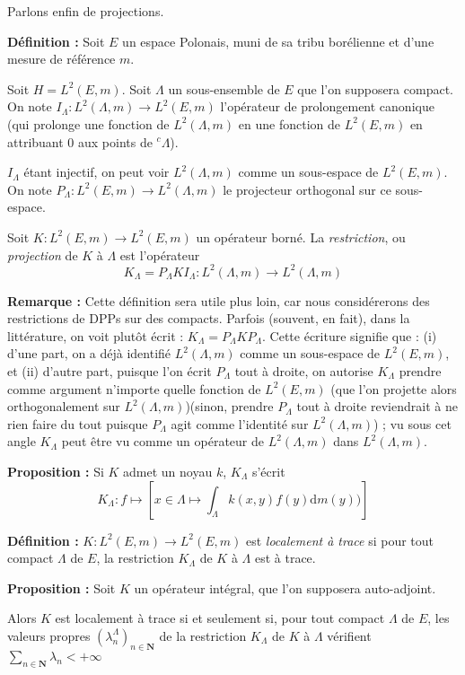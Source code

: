 \documentclass[12pt]{article}
\let\oldsum\sum
\renewcommand{\sum}{\oldsum\limits}
\begin{document}
Parlons enfin de projections.

\textbf{Définition :} Soit $E$ un espace Polonais, muni de sa tribu borélienne et d'une mesure de référence $m$. 

Soit $ H = L^2(E,m) $. Soit $\Lambda $ un sous-ensemble de $E$ que l'on supposera compact. On note $ I_\Lambda : L^2(\Lambda, m) \to L^2(E, m)$ l'opérateur de prolongement canonique (qui prolonge une fonction de $ L^2(\Lambda, m) $ en une fonction de $ L^2(E, m) $ en attribuant $0$ aux points de $ {}^c \Lambda $).

$ I_\Lambda $ étant injectif, on peut voir $ L^2(\Lambda, m) $ comme un sous-espace de $ L^2(E,m) $. On note $ P_\Lambda : L^2(E, m) \to L^2(\Lambda, m) $ le projecteur orthogonal sur ce sous-espace.

Soit $K : L^2(E,m) \to L^2(E,m)$ un opérateur borné. La \textit{restriction}, ou \textit{projection} de $K$ à $ \Lambda $ est l'opérateur $$ K_\Lambda = P_\Lambda K I_\Lambda  : L^2(\Lambda, m) \to L^2(\Lambda, m)$$

\textbf{Remarque :} Cette définition sera utile plus loin, car nous considérerons des restrictions de DPPs sur des compacts. Parfois (souvent, en fait), dans la littérature, on voit plutôt écrit : $ K_\Lambda = P_\Lambda K P_\Lambda $. Cette écriture signifie que : (i) d'une part, on a déjà identifié $ L^2(\Lambda, m) $ comme un sous-espace de $ L^2(E, m )$, et (ii) d'autre part, puisque l'on écrit $ P_\Lambda $ tout à droite, on autorise $ K_\Lambda $ prendre comme argument n'importe quelle fonction de $ L^2(E, m) $ (que l'on projette alors orthogonalement sur $ L^2(\Lambda, m) $)(sinon, prendre $ P_\Lambda $ tout à droite reviendrait à ne rien faire du tout puisque $ P_\Lambda $ agit comme l'identité sur $ L^2(\Lambda, m) $) ; vu sous cet angle $ K_\Lambda$ peut être vu comme un opérateur de $ L^2(\Lambda, m) $ dans $ L^2(\Lambda, m) $.

\textbf{Proposition :} Si $K$ admet un noyau $k$, $ K_\Lambda $ s'écrit $$ K_\Lambda : f \mapsto \left[ x \in \Lambda \mapsto \int_\Lambda k(x,y) f(y) \mathrm d m(y)) \right] $$

\textbf{Définition :} $K : L^2(E,m) \to L^2(E,m)$ est \textit{localement à trace} si pour tout compact $\Lambda$ de $E$, la restriction $ K_\Lambda $ de $K$ à $ \Lambda $ est à trace.

\textbf{Proposition :} Soit $K$ un opérateur intégral, que l'on supposera auto-adjoint.

Alors $ K $ est localement à trace si et seulement si, pour tout compact $ \Lambda $ de $ E $, les valeurs propres $ (\lambda^{\Lambda}_n)_{n \in \mathbf N} $ de la restriction $ K_\Lambda $ de $K $ à $ \Lambda $ vérifient $ \sum_{n \in \mathbf N} \lambda_n < +\infty$
\end{document}
